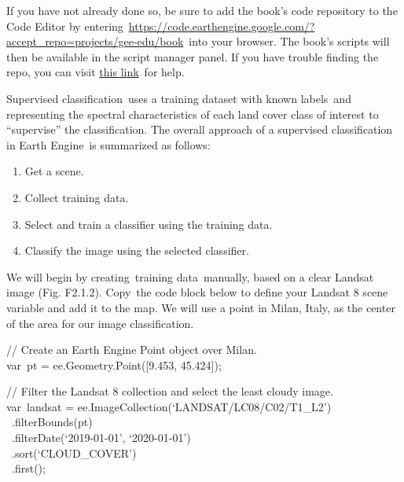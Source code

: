 \documentclass[
  letterpaper,
  DIV=11,
  numbers=noendperiod]{scrreprt}
\providecommand{\tightlist}{%
  \setlength{\itemsep}{0pt}\setlength{\parskip}{0pt}}\usepackage{longtable,booktabs,array}
\begin{document}
If you have not already done so, be sure to add the book's code
repository to the Code Editor by
entering~\href{https://www.google.com/url?q=https://code.earthengine.google.com/?accept_repo\%3Dprojects/gee-edu/book\&sa=D\&source=editors\&ust=1671458829866098\&usg=AOvVaw16x5swm9HlorS5Mbw7E42X}{}\href{https://www.google.com/url?q=https://code.earthengine.google.com/?accept_repo\%3Dprojects/gee-edu/book\&sa=D\&source=editors\&ust=1671458829866485\&usg=AOvVaw0-N-JCWWgnM493BKa7Ichm}{https://code.earthengine.google.com/?accept\_repo=projects/gee-edu/book}~into
your browser. The book's scripts will then be available in the script
manager panel. If you have trouble finding the repo, you can visit
\href{https://www.google.com/url?q=https://docs.google.com/presentation/d/1Kt6wGNoesYm__Cu3k3bnlbbyPN6m9SF4hQHK-pIDHfc/edit\%23slide\%3Did.g18a7b4b055d_0_624\&sa=D\&source=editors\&ust=1671458829866823\&usg=AOvVaw0ytMyRvutssBcVr2GdcBHA}{this
link}~for help.

Supervised classification~uses a training dataset with known labels~and
representing the spectral characteristics of each land cover class of
interest to ``supervise'' the classification. The overall approach of a
supervised classification in Earth Engine~is summarized as follows:

\begin{enumerate}
\def\labelenumi{\arabic{enumi}.}
\tightlist
\item
  Get a scene.
\item
  Collect training data.
\item
  Select and train a classifier using the training data.
\item
  Classify the image using the selected classifier.
\end{enumerate}

We will begin by creating~training data~manually, based on a clear
Landsat image (Fig. F2.1.2). Copy~the code block below to define your
Landsat 8 scene variable and add it to the map. We will use a point in
Milan, Italy, as the center of the area for our image classification.

// Create an Earth Engine Point object over Milan.\\
var~pt = ee.Geometry.Point({[}9.453, 45.424{]});

// Filter the Landsat 8 collection and select the least cloudy image.\\
var~landsat = ee.ImageCollection(`LANDSAT/LC08/C02/T1\_L2')\\
\hspace*{0.333em} ~.filterBounds(pt)\\
\hspace*{0.333em} ~.filterDate(`2019-01-01', `2020-01-01')\\
\hspace*{0.333em} ~.sort(`CLOUD\_COVER')\\
\hspace*{0.333em} ~.first();
\end{document}
